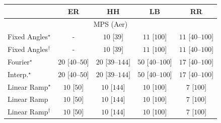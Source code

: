 \begin{tabular}{l|cccc|}
\toprule
            & ER & HH & LB & RR \\
\midrule
\multicolumn{5}{c}{\rule{0pt}{8pt}MPS (Aer)} \\
\midrule
Fixed Angles$^\star$ & {\cellcolor[HTML]{000000}} \color[HTML]{F1F1F1} {\cellcolor{white}} \color{black} - & {\cellcolor[HTML]{F7FCF5}} \color[HTML]{000000} $10$ [$39$] & {\cellcolor[HTML]{F6FCF4}} \color[HTML]{000000} $11$ [$100$] & {\cellcolor[HTML]{F6FCF4}} \color[HTML]{000000} $11$ [$40$--$100$] \\
Fixed Angles$^\dagger$ & {\cellcolor[HTML]{000000}} \color[HTML]{F1F1F1} {\cellcolor{white}} \color{black} - & {\cellcolor[HTML]{F7FCF5}} \color[HTML]{000000} $10$ [$39$] & {\cellcolor[HTML]{F6FCF4}} \color[HTML]{000000} $11$ [$100$] & {\cellcolor[HTML]{F6FCF4}} \color[HTML]{000000} $11$ [$40$--$100$] \\
Fourier$^\star$ & {\cellcolor[HTML]{F5FBF2}} \color[HTML]{000000} $20$ [$40$--$50$] & {\cellcolor[HTML]{F5FBF2}} \color[HTML]{000000} $20$ [$39$--$144$] & {\cellcolor[HTML]{EFF9EC}} \color[HTML]{000000} $50$ [$40$--$100$] & {\cellcolor[HTML]{F5FBF3}} \color[HTML]{000000} $17$ [$40$--$100$] \\
Interp.$^\star$ & {\cellcolor[HTML]{F5FBF2}} \color[HTML]{000000} $20$ [$40$--$50$] & {\cellcolor[HTML]{F5FBF2}} \color[HTML]{000000} $20$ [$39$--$144$] & {\cellcolor[HTML]{EFF9EC}} \color[HTML]{000000} $50$ [$40$--$100$] & {\cellcolor[HTML]{F5FBF3}} \color[HTML]{000000} $17$ [$40$--$100$] \\
Linear Ramp$^\star$ & {\cellcolor[HTML]{F7FCF5}} \color[HTML]{000000} $10$ [$50$] & {\cellcolor[HTML]{F7FCF5}} \color[HTML]{000000} $10$ [$144$] & {\cellcolor[HTML]{F7FCF5}} \color[HTML]{000000} $10$ [$100$] & {\cellcolor[HTML]{F7FCF5}} \color[HTML]{000000} $7$ [$100$] \\
Linear Ramp & {\cellcolor[HTML]{F7FCF5}} \color[HTML]{000000} $10$ [$50$] & {\cellcolor[HTML]{F7FCF5}} \color[HTML]{000000} $10$ [$144$] & {\cellcolor[HTML]{F7FCF5}} \color[HTML]{000000} $10$ [$100$] & {\cellcolor[HTML]{F7FCF5}} \color[HTML]{000000} $7$ [$100$] \\
Linear Ramp$^\dagger$ & {\cellcolor[HTML]{F7FCF5}} \color[HTML]{000000} $10$ [$50$] & {\cellcolor[HTML]{F7FCF5}} \color[HTML]{000000} $10$ [$144$] & {\cellcolor[HTML]{F7FCF5}} \color[HTML]{000000} $10$ [$100$] & {\cellcolor[HTML]{F7FCF5}} \color[HTML]{000000} $7$ [$100$] \\

\end{tabular}
